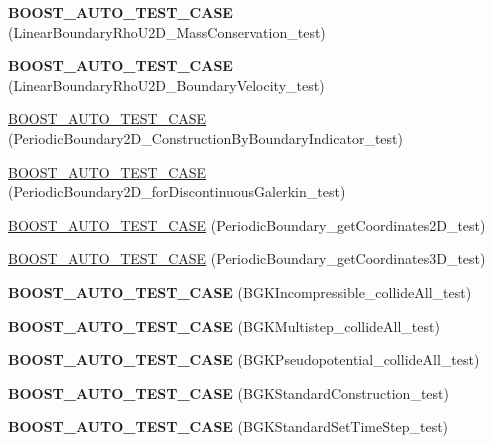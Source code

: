 \begin{DoxyCompactItemize}
\item 
\hypertarget{namespacenatrium_ab56d4c7d39e126ebd76a4433d7efb8e8}{
{\bfseries BOOST\_\-AUTO\_\-TEST\_\-CASE} (LinearBoundaryRhoU2D\_\-MassConservation\_\-test)}
\label{namespacenatrium_ab56d4c7d39e126ebd76a4433d7efb8e8}

\item 
\hypertarget{namespacenatrium_adc3a4cdd4cb4f509f325373919a22b58}{
{\bfseries BOOST\_\-AUTO\_\-TEST\_\-CASE} (LinearBoundaryRhoU2D\_\-BoundaryVelocity\_\-test)}
\label{namespacenatrium_adc3a4cdd4cb4f509f325373919a22b58}

\item 
\hyperlink{namespacenatrium_a4090d871d84ad4fb470c0b909c8aa3a2}{BOOST\_\-AUTO\_\-TEST\_\-CASE} (PeriodicBoundary2D\_\-ConstructionByBoundaryIndicator\_\-test)
\item 
\hyperlink{namespacenatrium_ac3aa16cb6afbde804febb51c503b72e3}{BOOST\_\-AUTO\_\-TEST\_\-CASE} (PeriodicBoundary2D\_\-forDiscontinuousGalerkin\_\-test)
\item 
\hyperlink{namespacenatrium_a6742e53417be0f418326a958ef719cd0}{BOOST\_\-AUTO\_\-TEST\_\-CASE} (PeriodicBoundary\_\-getCoordinates2D\_\-test)
\item 
\hyperlink{namespacenatrium_a6c15033ca6f4995b47ec6f3b8f2c8472}{BOOST\_\-AUTO\_\-TEST\_\-CASE} (PeriodicBoundary\_\-getCoordinates3D\_\-test)
\item 
\hypertarget{namespacenatrium_a1640922536fff531f06f653caebad0e3}{
{\bfseries BOOST\_\-AUTO\_\-TEST\_\-CASE} (BGKIncompressible\_\-collideAll\_\-test)}
\label{namespacenatrium_a1640922536fff531f06f653caebad0e3}

\item 
\hypertarget{namespacenatrium_a7e1836389d3bae75b3a38f7c84a4ed51}{
{\bfseries BOOST\_\-AUTO\_\-TEST\_\-CASE} (BGKMultistep\_\-collideAll\_\-test)}
\label{namespacenatrium_a7e1836389d3bae75b3a38f7c84a4ed51}

\item 
\hypertarget{namespacenatrium_a2bfe2e1f1a590e450e0ae6bf5f88b39d}{
{\bfseries BOOST\_\-AUTO\_\-TEST\_\-CASE} (BGKPseudopotential\_\-collideAll\_\-test)}
\label{namespacenatrium_a2bfe2e1f1a590e450e0ae6bf5f88b39d}

\item 
\hypertarget{namespacenatrium_a6dabfa8f4922e330d651ce3e658ae03c}{
{\bfseries BOOST\_\-AUTO\_\-TEST\_\-CASE} (BGKStandardConstruction\_\-test)}
\label{namespacenatrium_a6dabfa8f4922e330d651ce3e658ae03c}

\item 
\hypertarget{namespacenatrium_aecdb3d15ce07cddfd3aa4a264553174b}{
{\bfseries BOOST\_\-AUTO\_\-TEST\_\-CASE} (BGKStandardSetTimeStep\_\-test)}
\label{namespacenatrium_aecdb3d15ce07cddfd3aa4a264553174b}


\end{DoxyCompactItemize}
